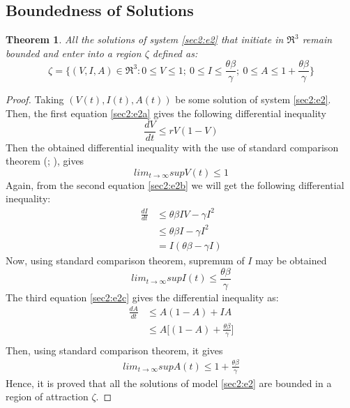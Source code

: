 \documentclass[12pt]{article}
\newtheorem{theorem}{Theorem}[section]
\numberwithin{equation}{section}
\begin{document}
\subsection{Boundedness of Solutions}
\begin{theorem} \label{Theorem 3.2}
All the solutions of system \eqref{sec2:e2} that initiate in $\Re^3$ remain bounded and enter into a region $\zeta$ defined as:\\
\begin{equation*}
\zeta=\bigg\{(V,I,A)\in \Re^3:0 \leq V\leq 1; ~0 \leq I\leq \frac{\theta \beta}{\gamma};~0\leq A\leq 1+\frac{\theta \beta}{\gamma}\bigg\}
\end{equation*}
\end{theorem}
\begin{proof}
Taking $(V(t),I(t), A(t))$ be some solution of system \eqref{sec2:e2}. Then, the first equation \eqref{sec2:e2a} gives the following differential inequality
\begin{equation}\label{sec3:e3}
\frac{dV}{dt}\leq rV(1-V)
\end{equation}
Then the obtained differential inequality with the use of standard comparison theorem (\cite{hale1969}; \cite{freedman1985}), gives
\begin{equation}\label{sec3:e4}
lim_{t\rightarrow\infty} sup V(t) \leq 1
\end{equation}
Again, from the second equation \eqref{sec2:e2b} we will get the following differential inequality:
\begin{align*}\label{sec3:e5}
\frac{dI}{dt}&\leq \theta \beta IV - \gamma I^2\\
                &\leq \theta \beta I - \gamma I^2\\
                &=I(\theta \beta - \gamma I)
\end{align*}
Now, using standard comparison theorem, supremum of $I$ may be obtained
\begin{equation}\label{sec3:e6}
lim_{t\rightarrow\infty} sup I(t) \leq \frac{\theta \beta}{\gamma}
\end{equation}
The third equation \eqref{sec2:e2c} gives the differential inequality as:
\begin{align*}
\frac{dA}{dt}&\leq A(1-A) + IA\\
             &\leq A\bigg[(1-A)+\frac{\theta \beta}{\gamma}\bigg]\\
\end{align*}
Then, using standard comparison theorem, it gives
\begin{align}\label{sec3:e7}
lim_{t\rightarrow\infty} sup A(t) \leq 1 + \frac{\theta \beta}{\gamma}
\end{align}
Hence, it is proved that all the solutions of model \eqref{sec2:e2} are bounded in a region of attraction $\zeta$.
\end{proof}
\end{document}

